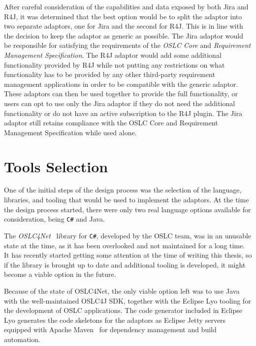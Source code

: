 After careful consideration of the capabilities and data exposed by both Jira and R4J, it was determined that the best option would be to split the adaptor into two separate adaptors, one for Jira and the second for R4J. This is in line with the decision to keep the adaptor as generic as possible. The Jira adaptor would be responsible for satisfying the requirements of the \emph{OSLC Core} and \emph{Requirement Management Specification}. The R4J adaptor would add some additional functionality provided by R4J while not putting any restrictions on what functionality has to be provided by any other third-party requirement management applications in order to be compatible with the generic adaptor. These adaptors can then be used together to provide the full functionality, or users can opt to use only the Jira adaptor if they do not need the additional functionality or do not have an active subscription to the R4J plugin. The Jira adaptor still retains compliance with the OSLC Core and Requirement Management Specification while used alone.

\section{Tools Selection}
One of the initial steps of the design process was the selection of the language, libraries, and tooling that would be used to implement the adaptors. At the time the design process started, there were only two real language options available for consideration, being \texttt{C\#} and Java.

The \emph{OSLC4Net} \cite{oslc4net} library for \texttt{C\#}, developed by the OSLC team, was in an unusable state at the time, as it has been overlooked and not maintained for a long time. It has recently started getting some attention at the time of writing this thesis, so if the library is brought up to date and additional tooling is developed, it might become a viable option in the future.

Because of the state of OSLC4Net, the only viable option left was to use Java with the well-maintained OSLC4J SDK, together with the Eclipse Lyo tooling for the development of OSLC applications. The code generator included in Eclipse Lyo generates the code skeletons for the adaptors as Eclipse Jetty servers \cite{jetty} equipped with Apache Maven \cite{maven} for dependency management and build automation.


